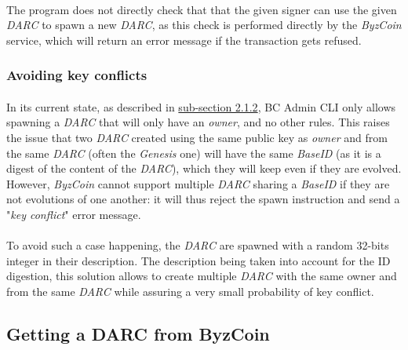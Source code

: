 \paragraph{}

The program does not directly check that that the given signer can use the given \textit{DARC} to spawn a new \textit{DARC}, as this check is performed directly by the \textit{ByzCoin} service, which will return an error message if the transaction gets refused.

\subsubsection{Avoiding key conflicts}
\label{subsection413}

\paragraph{}

In its current state, as described in \hyperref[subsection212]{sub-section 2.1.2}, BC Admin CLI only allows spawning a \textit{DARC} that will only have an \textit{owner}, and no other rules. This raises the issue that two \textit{DARC} created using the same public key as \textit{owner} and from the same \textit{DARC} (often the \textit{Genesis} one) will have the same \textit{BaseID} (as it is a digest of the content of the \textit{DARC}), which they will keep even if they are evolved. However, \textit{ByzCoin} cannot support multiple \textit{DARC} sharing a \textit{BaseID} if they are not evolutions of one another: it will thus reject the spawn instruction and send a "\textit{key conflict}" error message.

\paragraph{}

To avoid such a case happening, the \textit{DARC} are spawned with a random 32-bits integer in their description. The description being taken into account for the ID digestion, this solution allows to create multiple \textit{DARC} with the same owner and from the same \textit{DARC} while assuring a very small probability of key conflict.

\subsection{Getting a DARC from ByzCoin}

\paragraph{}

